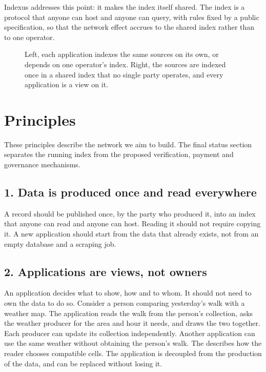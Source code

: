 \documentclass[11pt]{article}
\begin{document}
Indexus addresses this point: it makes the index itself shared. The index is a protocol that anyone can host and anyone can query, with rules fixed by a public specification, so that the network effect accrues to the shared index rather than to one operator.

\begin{figure}[H]
    \centering
    \caption{Left, each application indexes the same sources on its own, or depends on one operator's index. Right, the sources are indexed once in a shared index that no single party operates, and every application is a view on it.}
    \label{fig:silos}
\end{figure}

\section*{Principles}
These principles describe the network we aim to build. The final status section separates the running index from the proposed verification, payment and governance mechanisms.

\subsection*{1. Data is produced once and read everywhere}
A record should be published once, by the party who produced it, into an index that anyone can read and anyone can host. Reading it should not require copying it. A new application should start from the data that already exists, not from an empty database and a scraping job.

\subsection*{2. Applications are views, not owners}
An application decides what to show, how and to whom. It should not need to own the data to do so. Consider a person comparing yesterday's walk with a weather map. The application reads the walk from the person's collection, asks the weather producer for the area and hour it needs, and draws the two together. Each producer can update its collection independently. Another application can use the same weather without obtaining the person's walk. The  describes how the reader chooses compatible cells. The application is decoupled from the production of the data, and can be replaced without losing it.
\end{document}
